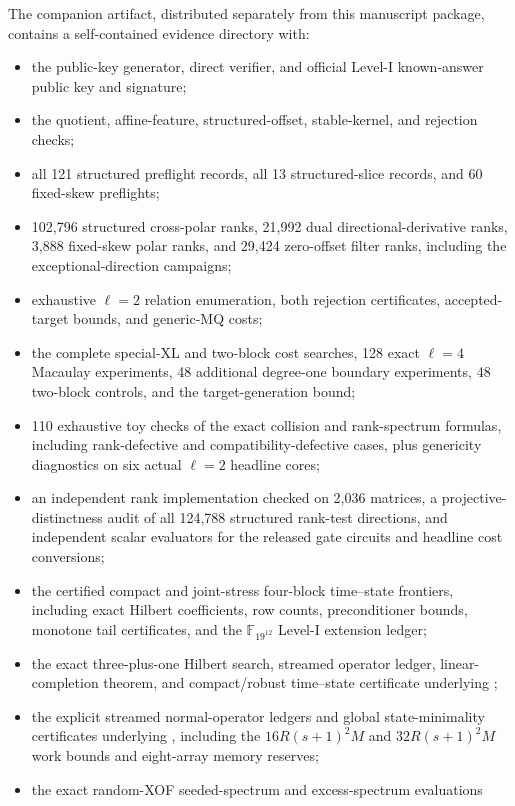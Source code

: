 \documentclass[11pt]{article}
\newcommand{\F}{\mathbb F}
\begin{document}
The companion artifact, distributed separately from this manuscript
package, contains a self-contained evidence directory with:
\begin{itemize}
\item the public-key generator, direct verifier, and official Level-I
known-answer public key and signature;
\item the quotient, affine-feature, structured-offset, stable-kernel, and
rejection checks;
\item all 121 structured preflight records, all 13 structured-slice records,
and 60 fixed-skew preflights;
\item 102,796 structured cross-polar ranks, 21,992 dual directional-derivative
ranks, 3,888 fixed-skew polar ranks, and 29,424 zero-offset filter ranks,
including the exceptional-direction campaigns;
\item exhaustive $\ell=2$ relation enumeration, both rejection certificates,
accepted-target bounds, and generic-MQ costs;
\item the complete special-XL and two-block cost searches, 128 exact
$\ell=4$ Macaulay experiments, 48 additional degree-one boundary experiments,
48 two-block controls, and the target-generation bound;
\item 110 exhaustive toy checks of the exact collision and rank-spectrum formulas,
including rank-defective and compatibility-defective cases, plus genericity
diagnostics on six actual $\ell=2$ headline cores;
\item an independent rank implementation checked on 2,036 matrices, a
projective-distinctness audit of all 124,788 structured rank-test directions,
and independent scalar evaluators for the released gate circuits and headline
cost conversions;
\item the certified compact and joint-stress four-block time--state
frontiers, including exact Hilbert coefficients, row counts, preconditioner
bounds, monotone tail certificates, and the $\F_{19^{12}}$ Level-I extension
ledger;
\item the exact three-plus-one Hilbert search, streamed operator ledger,
linear-completion theorem, and compact/robust time--state certificate underlying
;
\item the explicit streamed normal-operator ledgers and global
state-minimality certificates underlying
, including the
$16R(s+1)^2M$ and $32R(s+1)^2M$ work bounds and eight-array memory reserves;
\item the exact random-XOF seeded-spectrum and excess-spectrum evaluations

\end{itemize}
\end{document}
